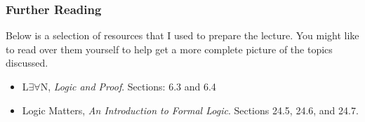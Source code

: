 \documentclass{beamer}
\theoremstyle{indentDefn} \newtheorem{defn}[]{Definition}
\begin{document}
\begin{frame}
  \frametitle{Further Reading}


Below is a selection of resources that I used to prepare the lecture. You might like to read over them yourself to help get a more complete picture of the topics discussed. 

\vspace{0.5cm}

\begin{itemize}
	\item L$\exists \forall$N, \emph{Logic and Proof}. Sections: 6.3 and 6.4 
	\item Logic Matters, \emph{An Introduction to Formal Logic}. Sections 24.5, 24.6, and 24.7.
\end{itemize}



\end{frame}
\end{document}
